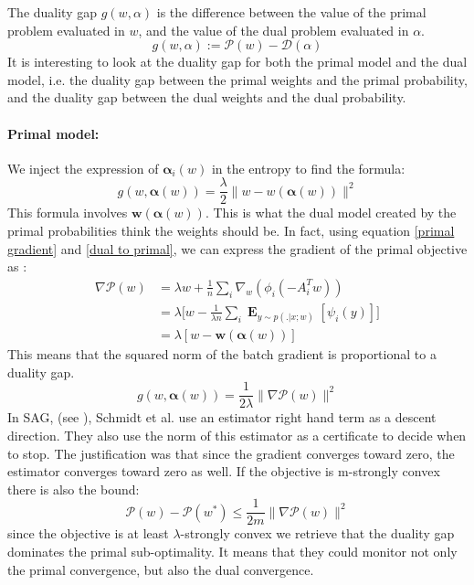 \documentclass{article}
\DeclareMathOperator{\1}{\mathbb{1}}
\DeclareMathOperator{\E}{\mathbf{E}}
\begin{document}
The duality gap $g(w,\alpha)$ is the difference between the value  of the primal problem evaluated in $w$, and the value of the dual problem evaluated in $\alpha$.
\begin{equation*}
	g(w,\alpha) := \mathscr P(w) - \mathscr D(\alpha)
\end{equation*}
It is interesting to look at the duality gap for both the primal model and the dual model, i.e. the duality gap between the primal weights and the primal probability, and the duality gap between the dual weights and the dual probability.

\paragraph{Primal model:}
We inject the expression of $\bm \alpha_i(w)$ in the entropy to find the formula:
\begin{equation}
	\label{primal duality gap}
	g(w,\bm \alpha(w)) = \frac{\lambda}{2} \|w-w(\bm \alpha(w))\|^2
\end{equation}
This formula involves $\bm w(\bm \alpha(w))$.
This is what the dual model created by the primal probabilities think the weights should be. 
In fact, using equation \ref{primal gradient} and \ref{dual to primal}, we can express the gradient of the primal objective 	as :
\begin{align*}
	\nabla \mathscr P(w) 
	& = \lambda w + \frac{1}{n} \sum_i \nabla_w(\phi_i(-A_i^Tw)) \\
	& = \lambda \bigg [ w - \frac{1}{\lambda n} \sum_i \E_{y \sim p(. | x ; w)} [\psi_i(y)] \bigg ] \\
	& = \lambda [ w - \bm w(\bm \alpha(w))]
\end{align*}
This means that the squared norm of the batch gradient is proportional to a duality gap.
\begin{equation}
	g(w,\bm \alpha(w)) = \frac{1}{2 \lambda} \|\nabla \mathscr P(w)\|^2
\end{equation}
In SAG, (see \cite{schmidt_non-uniform_2015}), Schmidt et al. use an estimator right hand term as a descent direction.
They also use the norm of this estimator as a certificate to decide when to stop.
The justification was that since the gradient converges toward zero, the estimator converges toward zero as well.
If the objective is m-strongly convex there is also the bound:
\begin{equation*}
	\mathscr P (w) - \mathscr P(w^*) \leq \frac{1}{2 m}\|\nabla \mathscr P (w)\|^2
\end{equation*}
since the objective is at least $\lambda$-strongly convex we retrieve that the duality gap dominates the primal sub-optimality.
It means that they could monitor not only the primal convergence, but also the dual convergence.
\end{document}
